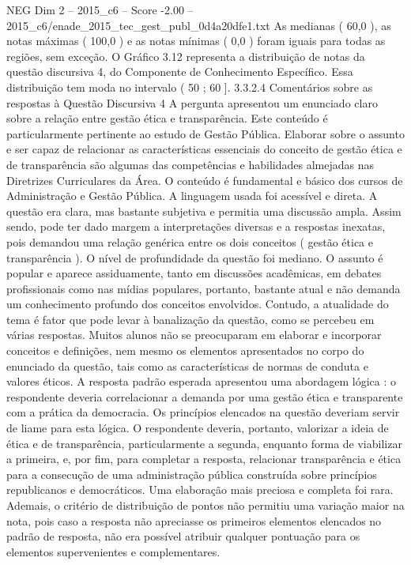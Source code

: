 \begin{textsample}{NEG Dim 2 – 2015\_c6 – Score -2.00 – 2015\_c6/enade\_2015\_tec\_gest\_publ\_0d4a20dfe1.txt}
As medianas ( 60,0 ), as notas máximas ( 100,0 ) e as notas mínimas ( 0,0 ) foram iguais para todas as regiões, sem exceção.
O Gráfico 3.12 representa a distribuição de notas da questão discursiva 4, do Componente de Conhecimento Específico.
Essa distribuição tem moda no intervalo ( 50 ; 60 ]. 3.3.2.4 Comentários sobre as respostas à Questão Discursiva 4 A pergunta apresentou um enunciado claro sobre a relação entre gestão ética e transparência.
Este conteúdo é particularmente pertinente ao estudo de Gestão Pública.
Elaborar sobre o assunto e ser capaz de relacionar as características essenciais do conceito de gestão ética e de transparência são algumas das competências e habilidades almejadas nas Diretrizes Curriculares da Área.
O conteúdo é fundamental e básico dos cursos de Administração e Gestão Pública.
A linguagem usada foi acessível e direta.
A questão era clara, mas bastante subjetiva e permitia uma discussão ampla.
Assim sendo, pode ter dado margem a interpretações diversas e a respostas inexatas, pois demandou uma relação genérica entre os dois conceitos ( gestão ética e transparência ).
O nível de profundidade da questão foi mediano.
O assunto é popular e aparece assiduamente, tanto em discussões acadêmicas, em debates profissionais como nas mídias populares, portanto, bastante atual e não demanda um conhecimento profundo dos conceitos envolvidos.
Contudo, a atualidade do tema é fator que pode levar à banalização da questão, como se percebeu em várias respostas.
Muitos alunos não se preocuparam em elaborar e incorporar conceitos e definições, nem mesmo os elementos apresentados no corpo do enunciado da questão, tais como as características de normas de conduta e valores éticos.
A resposta padrão esperada apresentou uma abordagem lógica : o respondente deveria correlacionar a demanda por uma gestão ética e transparente com a prática da democracia.
Os princípios elencados na questão deveriam servir de liame para esta lógica.
O respondente deveria, portanto, valorizar a ideia de ética e de transparência, particularmente a segunda, enquanto forma de viabilizar a primeira, e, por fim, para completar a resposta, relacionar transparência e ética para a consecução de uma administração pública construída sobre princípios republicanos e democráticos.
Uma elaboração mais preciosa e completa foi rara.
Ademais, o critério de distribuição de pontos não permitiu uma variação maior na nota, pois caso a resposta não apreciasse os primeiros elementos elencados no padrão de resposta, não era possível atribuir qualquer pontuação para os elementos supervenientes e complementares.

\end{textsample}

